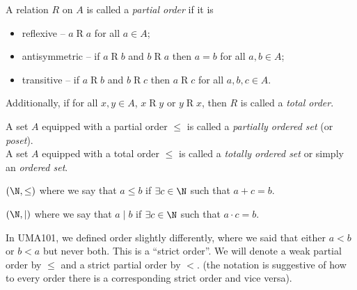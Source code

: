 \begin{definition*} \label{def:relations:partial_order}
    A relation $R$ on $A$ is called a \emph{partial order} if it is
    \begin{itemize}
        \item reflexive -- $a \mathrel{R} a$ for all $a \in A$;
        \item antisymmetric -- if $a \mathrel{R} b$ and $b \mathrel{R} a$
        then $a = b$ for all $a, b \in A$;
        \item transitive -- if $a \mathrel{R} b$ and $b \mathrel{R} c$ then
        $a \mathrel{R} c$ for all $a, b, c \in A$.
    \end{itemize}
    Additionally, if for all $x, y \in A$, $x \mathrel{R} y$ or
    $y \mathrel{R} x$, then $R$ is called a \emph{total order}.

    A set $A$ equipped with a partial order $\le$ is called a
    \emph{partially ordered set} (or \emph{poset}). \\
    A set $A$ equipped with a total order $\le$ is called a \emph{totally
    ordered set} or simply an \emph{ordered set}.
\end{definition*}
\begin{examples}
    \item $(\N, \le)$ where we say that $a \le b$ if $\exists c \in \N$ such
    that $a + c = b$.
    \item $(\N, \mid)$ where we say that $a \mid b$ if $\exists c \in \N$ such
    that $a \cdot c = b$.
\end{examples}

In UMA101, we defined order slightly differently, where we said that either
$a < b$ or $b < a$ but never both.
This is a ``strict order''.
We will denote a weak partial order by $\le$
and a strict partial order by $<$.
(the notation is suggestive of how to every order there is a corresponding
strict order and vice versa).

